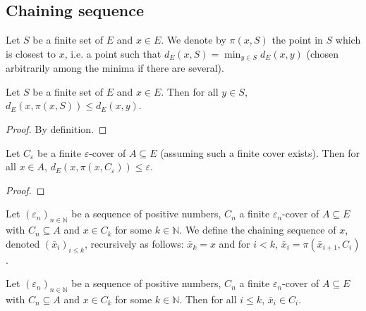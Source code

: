 \subsection{Chaining sequence}


\begin{definition}\label{def:nearestPt}
  \leanok
Let $S$ be a finite set of $E$ and $x \in E$.
We denote by $\pi(x, S)$ the point in $S$ which is closest to $x$, i.e. a point such that $d_E(x, S) = \min_{y \in S} d_E(x, y)$ (chosen arbitrarily among the minima if there are several).
\end{definition}


\begin{lemma}\label{lem:dist_nearestPt_le}
  \leanok
Let $S$ be a finite set of $E$ and $x \in E$.
Then for all $y \in S$, $d_E(x, \pi(x, S)) \le d_E(x, y)$.
\end{lemma}

\begin{proof}\leanok
By definition.
\end{proof}


\begin{lemma}\label{lem:dist_nearestPt_of_isCover}
  \leanok
Let $C_\varepsilon$ be a finite $\varepsilon$-cover of $A \subseteq E$ (assuming such a finite cover exists).
Then for all $x \in A$, $d_E(x, \pi(x, C_\varepsilon)) \le \varepsilon$.
\end{lemma}

\begin{proof}\leanok

\end{proof}


\begin{definition}\label{def:chainingSequence}
  \leanok
Let $(\varepsilon_n)_{n \in \mathbb{N}}$ be a sequence of positive numbers, $C_n$ a finite $\varepsilon_n$-cover of $A \subseteq E$ with $C_n \subseteq A$ and $x \in C_k$ for some $k \in \mathbb{N}$.
We define the chaining sequence of $x$, denoted $(\bar{x}_i)_{i \le k}$, recursively as follows: $\bar{x}_k = x$ and for $i < k$, $\bar{x}_i = \pi(\bar{x}_{i+1}, C_i)$.
\end{definition}


\begin{lemma}\label{lem:chainingSequence_mem}
  \leanok
Let $(\varepsilon_n)_{n \in \mathbb{N}}$ be a sequence of positive numbers, $C_n$ a finite $\varepsilon_n$-cover of $A \subseteq E$ with $C_n \subseteq A$ and $x \in C_k$ for some $k \in \mathbb{N}$.
Then for all $i \le k$, $\bar{x}_i\in C_i$.
\end{lemma}

